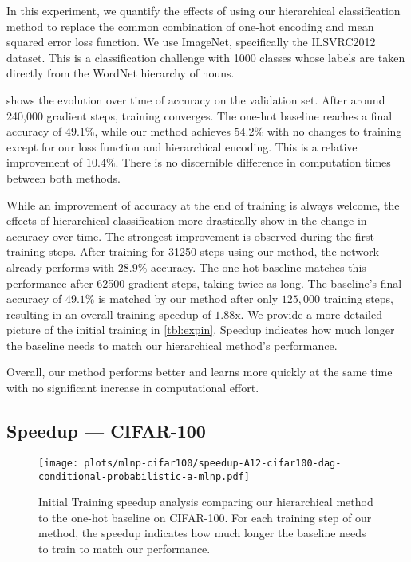 \documentclass[10pt,twocolumn,letterpaper]{article}
\begin{document}
In this experiment, we quantify the effects of using our hierarchical classification method
to replace the common combination of one-hot encoding and mean squared error loss function.
We use ImageNet, specifically the ILSVRC2012 dataset. This is a classification challenge with 1000 classes
whose labels are
taken directly from the WordNet hierarchy of nouns. 

 shows the evolution over time of accuracy on the validation set.
After around 240,000 gradient steps, training converges. The one-hot baseline reaches
a final accuracy of $49.1\%$, while our method achieves $54.2\%$ with no changes to training
except for our loss function and hierarchical encoding. This is a relative improvement of $10.4\%$. There is no discernible difference
in computation times between both methods.

While an improvement of accuracy at the end of training is always welcome,
the effects of hierarchical classification more drastically show in the change in accuracy over
time. The strongest improvement is observed during the first training steps.
After training for 31250 steps using our method, the network already performs with $28.9\%$ accuracy.
The one-hot baseline matches this performance after 62500 gradient steps, taking twice as long.
The baseline's final accuracy of $49.1\%$ is matched by our method after only $125,000$ training
steps, resulting in an overall training speedup of $1.88\text{x}$.
We provide a more detailed picture of the initial training in \cref{tbl:expin}. Speedup indicates
how much longer the baseline needs to match our hierarchical method's performance.

Overall, our method performs better and learns more quickly at the same time with no significant
increase in computational effort.


\subsection{Speedup --- CIFAR-100}
\begin{figure}
\centering
\texttt{[image: plots/mlnp-cifar100/speedup-A12-cifar100-dag-conditional-probabilistic-a-mlnp.pdf]}
\caption{Initial Training speedup analysis comparing our hierarchical method to the one-hot baseline on CIFAR-100. For each training
step of our method, the speedup indicates how much longer the baseline needs to train to match our performance.}
\label{fig:expcifarspeedup}
\end{figure}
\end{document}
